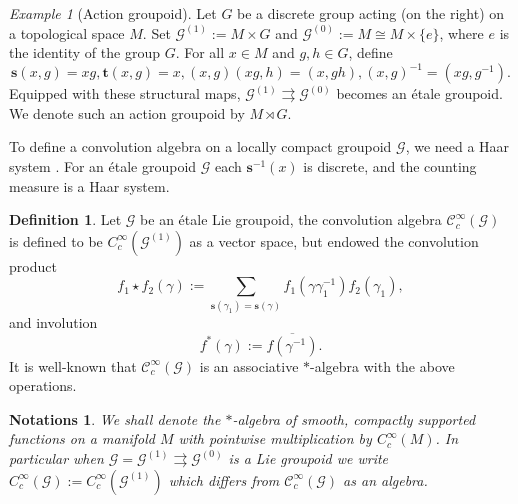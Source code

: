 \documentclass[a4paper]{amsart}
\newcommand{\tto}{\rightrightarrows}
\newcommand{\maC}{\mathcal C}
\newcommand{\maG}{\mathcal G}
\newcommand{\bs}{\mathbf{s}}
\newcommand{\bt}{\mathbf{t}}
\newcommand\<{\langle}
\renewcommand\>{\rangle}
\newtheorem{nota}[theorem]{Notations}
\theoremstyle{definition}
\newtheorem{dfn}[theorem]{Definition}
\theoremstyle{remark}
\newtheorem{example}[theorem]{Example}
\begin{document}
\begin{example}[Action groupoid]
Let $G$ be a discrete group acting (on the right) on a topological space $M$.
Set $\maG^{(1)}:= M \times G$ and $\maG^{(0)}:= M \cong M \times \{ e\}$, where
$e$ is the identity of the group $G$.
For all $x \in M$ and $g, h \in G$, define
$$\bs (x,g) = x g, \bt (x, g)= x, (x, g) (x g, h)=(x, g h), (x,g)^{-1}=(x g, g^{-1}).$$
Equipped with these structural maps,
$\maG^{(1)}\tto \maG^{(0)}$ becomes an \'etale groupoid.
We denote such an action groupoid by $M \rtimes G$.
\end{example}

To define a convolution algebra on a locally compact groupoid $\maG$,
we need a Haar system \cite{RenBook80}.
For an \'etale groupoid $\maG$ each $\bs ^{-1} (x)$ is discrete, and the counting measure is a Haar system.

\begin{dfn}
\label{Star}
Let $\maG$ be an \'etale Lie groupoid,
the convolution algebra $\maC ^\infty _c (\maG)$ is defined to be $C_c ^\infty (\maG ^{(1)})$ as a vector space,
but endowed the convolution product
$$ f_1 \star f_2 (\gamma) := \sum _{\bs (\gamma _1 ) = \bs (\gamma)} f_1 (\gamma \gamma _1 ^{-1}) f_2 (\gamma _1),$$
and involution
$$f ^* (\gamma) := \overline {f (\gamma ^{-1})} .$$
It is well-known that $\maC ^\infty _c (\maG)$ is an associative $*$-algebra with the above operations.
\end{dfn}

\begin{nota}
We shall denote the $*$-algebra of smooth,
compactly supported functions on a manifold $M$ with pointwise multiplication by $C ^\infty _c (M)$.
In particular when $\maG = \maG ^{(1)} \rightrightarrows \maG ^{(0)}$ is a Lie groupoid we write
$C ^\infty _c (\maG) := C^\infty _c (\maG ^{(1)})$ which differs from $\maC ^\infty _c (\maG)$ as an algebra.
\end{nota}

%
\end{document}

